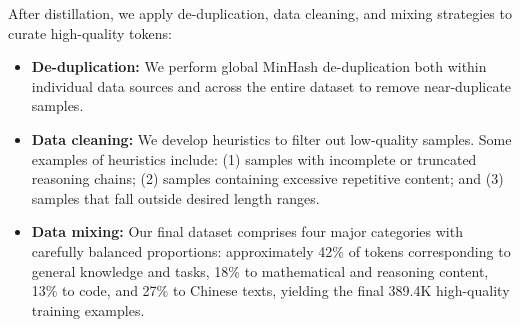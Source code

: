 \documentclass{article} %
\begin{document}
After distillation, we apply de-duplication, data cleaning, and mixing strategies to curate high-quality tokens:
\begin{itemize}
    \item \textbf{De-duplication:} We perform global MinHash de-duplication both within individual data sources and across the entire dataset to remove near-duplicate samples.
    
    \item \textbf{Data cleaning:} We develop heuristics to filter out low-quality samples. Some examples of heuristics include: (1) samples with incomplete or truncated reasoning chains; (2) samples containing excessive repetitive content; and (3) samples that fall outside desired length ranges.
    
    \item \textbf{Data mixing:} Our final dataset comprises four major categories with carefully balanced proportions: approximately 42\% of tokens corresponding to general knowledge and tasks, 18\% to mathematical and reasoning content, 13\% to code, and 27\% to Chinese texts, yielding the final 389.4K high-quality training examples.
\end{itemize}




\end{document}
